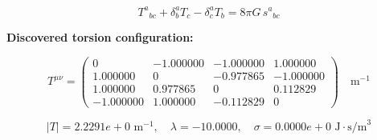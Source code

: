 
\begin{equation}
  T^a{}_{bc} + \delta^a_b T_c - \delta^a_c T_b = 8\pi G \, s^a{}_{bc}
\end{equation}

\textbf{Discovered torsion configuration:}

\begin{equation}
  T^{\mu\nu} = \begin{pmatrix}
    0 & -1.000000 & -1.000000 & 1.000000 \\
    1.000000 & 0 & -0.977865 & -1.000000 \\
    1.000000 & 0.977865 & 0 & 0.112829 \\
    -1.000000 & 1.000000 & -0.112829 & 0
  \end{pmatrix} \quad \text{m}^{-1}
\end{equation}

\begin{equation}
  |T| = 2.2291e+0 \text{ m}^{-1}, \quad
  \lambda = -10.0000, \quad
  \sigma = 0.0000e+0 \text{ J}\cdot\text{s/m}^3
\end{equation}